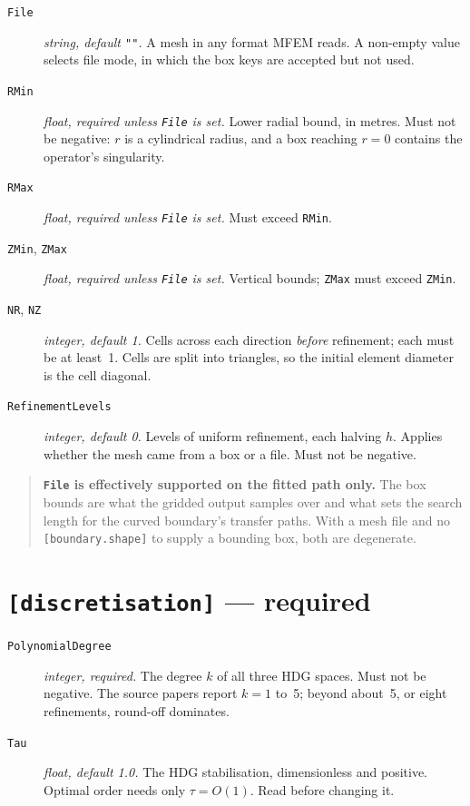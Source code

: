 \begin{description}

\item[\texttt{File}] \emph{string, default \texttt{""}.} A mesh in any format
	MFEM reads. A non-empty value selects file mode, in which the box keys are
	accepted but not used.

\item[\texttt{RMin}] \emph{float, required unless \texttt{File} is set.} Lower
	radial bound, in metres. Must not be negative: $r$ is a cylindrical radius,
	and a box reaching $r = 0$ contains the operator's singularity.

\item[\texttt{RMax}] \emph{float, required unless \texttt{File} is set.} Must
	exceed \texttt{RMin}.

\item[\texttt{ZMin}, \texttt{ZMax}] \emph{float, required unless \texttt{File}
	is set.} Vertical bounds; \texttt{ZMax} must exceed \texttt{ZMin}.

\item[\texttt{NR}, \texttt{NZ}] \emph{integer, default 1.} Cells across each
	direction \emph{before} refinement; each must be at least~1. Cells are split
	into triangles, so the initial element diameter is the cell diagonal.

\item[\texttt{RefinementLevels}] \emph{integer, default 0.} Levels of uniform
	refinement, each halving $h$. Applies whether the mesh came from a box or a
	file. Must not be negative.

\end{description}

\begin{quote}
	\textbf{\texttt{File} is effectively supported on the fitted path only.} The
	box bounds are what the gridded output samples over and what sets the search
	length for the curved boundary's transfer paths. With a mesh file and no
	\texttt{[boundary.shape]} to supply a bounding box, both are degenerate.
\end{quote}

\section{\texttt{[discretisation]} --- required}

\begin{description}

\item[\texttt{PolynomialDegree}] \emph{integer, required.} The degree $k$ of all
	three HDG spaces. Must not be negative. The source papers report $k = 1$
	to~5; beyond about~5, or eight refinements, round-off dominates.

\item[\texttt{Tau}] \emph{float, default 1.0.} The HDG stabilisation,
	dimensionless and positive. Optimal order needs only $\tau = O(1)$. Read
	 before changing it.

\end{description}

